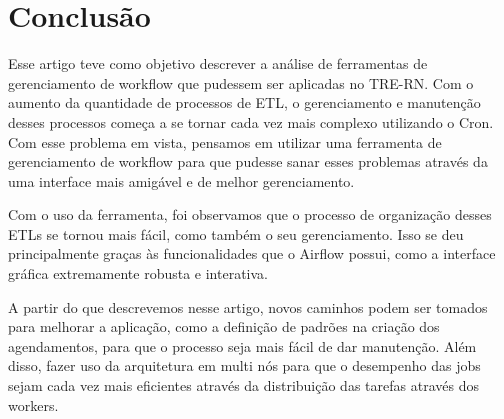 \section{Conclusão}

Esse artigo teve como objetivo descrever a análise de ferramentas de gerenciamento de workflow que pudessem ser aplicadas no TRE-RN. Com o aumento da quantidade de processos de ETL, o gerenciamento e manutenção desses processos começa a se tornar cada vez mais complexo utilizando o Cron. Com esse problema em vista, pensamos em utilizar uma ferramenta de gerenciamento de workflow para que pudesse sanar esses problemas através da uma interface mais amigável e de melhor gerenciamento.

Com o uso da ferramenta, foi observamos que o processo de organização desses ETLs se tornou mais fácil, como também o seu gerenciamento. Isso se deu principalmente graças às funcionalidades que o Airflow possui, como a interface gráfica extremamente robusta e interativa.

A partir do que descrevemos nesse artigo, novos caminhos podem ser tomados para melhorar a aplicação, como a definição de padrões na criação dos agendamentos, para que o processo seja mais fácil de dar manutenção. Além disso, fazer uso da arquitetura em multi nós para que o desempenho das jobs sejam cada vez mais eficientes através da distribuição das tarefas através dos workers.